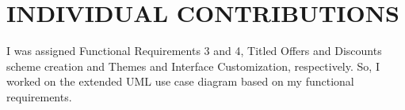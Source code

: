 \chapter{INDIVIDUAL CONTRIBUTIONS} \label{ch:data}
I was assigned Functional Requirements 3 and 4, Titled Offers and Discounts scheme creation and Themes and Interface Customization, respectively. So, I worked on the extended UML use case diagram based on my functional requirements.